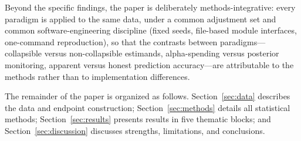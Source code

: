 Beyond the specific findings, the paper is deliberately
methods-integrative: every paradigm is applied to the same data, under a
common adjustment set and common software-engineering discipline (fixed
seeds, file-based module interfaces, one-command reproduction), so that
the contrasts between paradigms---collapsible versus non-collapsible
estimands, alpha-spending versus posterior monitoring, apparent versus
honest prediction accuracy---are attributable to the methods rather than
to implementation differences.

The remainder of the paper is organized as follows.
Section~\ref{sec:data} describes the data and endpoint construction;
Section~\ref{sec:methods} details all statistical methods;
Section~\ref{sec:results} presents results in five thematic blocks; and
Section~\ref{sec:discussion} discusses strengths, limitations, and
conclusions.
